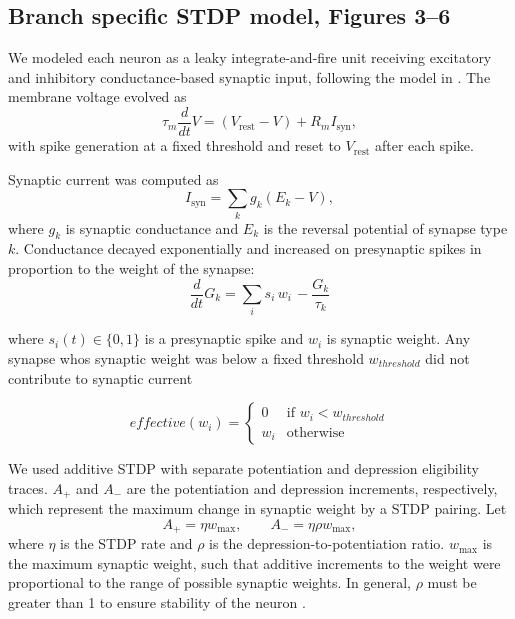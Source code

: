 \subsection*{Branch specific STDP model, Figures 3--6}

We modeled each neuron as a leaky integrate-and-fire unit receiving excitatory and inhibitory conductance-based synaptic input, following the model in \citep{songCompetitiveHebbianLearning2000}. The membrane voltage evolved as
\begin{equation*}
\tau_m \frac{d}{dt}V = (V_{\mathrm{rest}} - V) + R_m I_{\mathrm{syn}},
\end{equation*}
with spike generation at a fixed threshold and reset to $V_{\mathrm{rest}}$ after each spike.

Synaptic current was computed as
\begin{equation*}
I_{\mathrm{syn}} = \sum_k g_k (E_k - V),
\end{equation*}
where $g_k$ is synaptic conductance and $E_k$ is the reversal potential of synapse type $k$. Conductance decayed exponentially and increased on presynaptic spikes in proportion to the weight of the synapse:
\begin{equation*}
    \frac{d}{dt}G_k = \sum_i s_i\,w_i\, - \frac{G_k}{\tau_k}
\end{equation*}

where $s_i(t)\in\{0,1\}$ is a presynaptic spike and $w_i$ is synaptic weight. Any synapse whos synaptic weight was below a fixed threshold $w_{threshold}$ did not contribute to synaptic current

\begin{equation*}
effective(w_i) = \begin{cases}
0 & \text{if } w_i < w_{threshold} \\
w_i & \text{otherwise}
\end{cases}
\end{equation*}

We used additive STDP with separate potentiation and depression eligibility traces. $A_+$ and $A_-$ are the potentiation and depression increments, respectively, which represent the maximum change in synaptic weight by a STDP pairing. Let
\begin{equation*}
A_+ = \eta w_{\max}, \qquad A_- = \eta \rho w_{\max},
\end{equation*}
where $\eta$ is the STDP rate and $\rho$ is the depression-to-potentiation ratio. $w_{\max}$ is the maximum synaptic weight, such that additive increments to the weight were proportional to the range of possible synaptic weights. In general, $\rho$ must be greater than 1 to ensure stability of the neuron \citep{songCompetitiveHebbianLearning2000}. 

